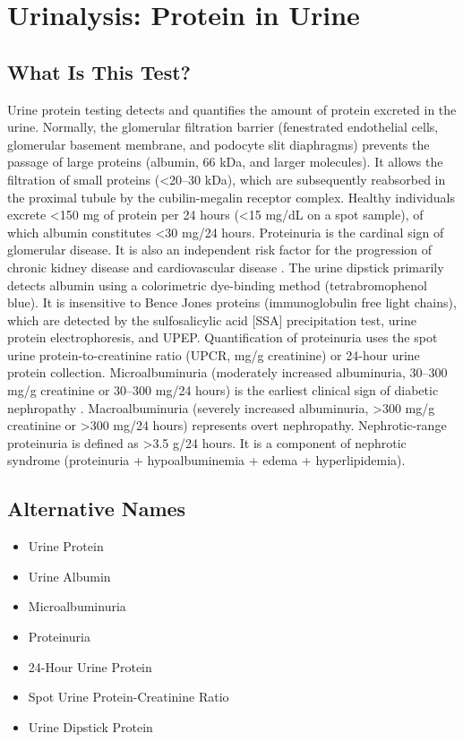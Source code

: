 \chapter{Urinalysis: Protein in Urine}
\section*{What Is This Test?}
Urine protein testing detects and quantifies the amount of protein excreted in the urine. Normally, the glomerular filtration barrier (fenestrated endothelial cells, glomerular basement membrane, and podocyte slit diaphragms) prevents the passage of large proteins (albumin, 66 kDa, and larger molecules). It allows the filtration of small proteins (<20--30 kDa), which are subsequently reabsorbed in the proximal tubule by the cubilin-megalin receptor complex. Healthy individuals excrete <150 mg of protein per 24 hours (<15 mg/dL on a spot sample), of which albumin constitutes <30 mg/24 hours. Proteinuria is the cardinal sign of glomerular disease. It is also an independent risk factor for the progression of chronic kidney disease and cardiovascular disease \cite{levey2003national,levey2009proteinuria}. The urine dipstick primarily detects albumin using a colorimetric dye-binding method (tetrabromophenol blue). It is insensitive to Bence Jones proteins (immunoglobulin free light chains), which are detected by the sulfosalicylic acid [SSA] precipitation test, urine protein electrophoresis, and UPEP. Quantification of proteinuria uses the spot urine protein-to-creatinine ratio (UPCR, mg/g creatinine) or 24-hour urine protein collection. Microalbuminuria (moderately increased albuminuria, 30--300 mg/g creatinine or 30--300 mg/24 hours) is the earliest clinical sign of diabetic nephropathy \cite{toto2004microalbuminuria}. Macroalbuminuria (severely increased albuminuria, >300 mg/g creatinine or >300 mg/24 hours) represents overt nephropathy. Nephrotic-range proteinuria is defined as >3.5 g/24 hours. It is a component of nephrotic syndrome (proteinuria + hypoalbuminemia + edema + hyperlipidemia).
\section*{Alternative Names}
\begin{itemize}
  \item Urine Protein
  \item Urine Albumin
  \item Microalbuminuria
  \item Proteinuria
  \item 24-Hour Urine Protein
  \item Spot Urine Protein-Creatinine Ratio
  \item Urine Dipstick Protein
\end{itemize}
